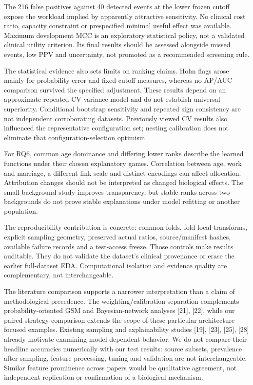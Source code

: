 \documentclass[10pt,twocolumn,letterpaper]{article}
\begin{document}
The 216 false positives against 40 detected events at the lower frozen cutoff expose the workload implied by apparently attractive sensitivity. No clinical cost ratio, capacity constraint or prespecified minimal useful effect was available. Maximum development MCC is an exploratory statistical policy, not a validated clinical utility criterion. Its final results should be assessed alongside missed events, low PPV and uncertainty, not promoted as a recommended screening rule.


The statistical evidence also sets limits on ranking claims. Holm flags arose mainly for probability error and fixed-cutoff measures, whereas no AP/AUC comparison survived the specified adjustment. These results depend on an approximate repeated-CV variance model and do not establish universal superiority. Conditional bootstrap sensitivity and repeated sign consistency are not independent corroborating datasets. Previously viewed CV results also influenced the representative configuration set; nesting calibration does not eliminate that configuration-selection optimism.


For RQ6, common age dominance and differing lower ranks describe the learned functions under their chosen explanatory games. Correlation between age, work and marriage, a different link scale and distinct encodings can affect allocation. Attribution changes should not be interpreted as changed biological effects. The small background study improves transparency, but stable ranks across two backgrounds do not prove stable explanations under model refitting or another population.


The reproducibility contribution is concrete: common folds, fold-local transforms, explicit sampling geometry, preserved actual ratios, source/manifest hashes, available failure records and a test-access freeze. Those controls make results auditable. They do not validate the dataset's clinical provenance or erase the earlier full-dataset EDA. Computational isolation and evidence quality are complementary, not interchangeable.


The literature comparison supports a narrower interpretation than a claim of methodological precedence. The weighting/calibration separation complements probability-oriented GSM and Bayesian-network analyses [21], [22], while our paired strategy comparison extends the scope of these particular architecture-focused examples. Existing sampling and explainability studies [19], [23], [25], [28] already motivate examining model-dependent behavior. We do not compare their headline accuracies numerically with our test results: source subsets, prevalence after sampling, feature processing, tuning and validation are not interchangeable. Similar feature prominence across papers would be qualitative agreement, not independent replication or confirmation of a biological mechanism.
\end{document}
